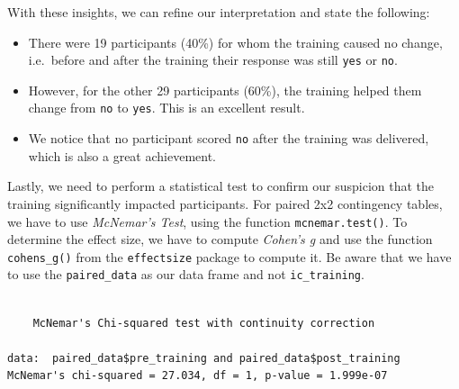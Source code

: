 \documentclass[
  letterpaper,
  DIV=11,
  numbers=noendperiod]{scrreprt}
\newenvironment{Shaded}{\begin{snugshade}}{\end{snugshade}}
\newcommand{\CommentTok}[1]{\textcolor[rgb]{0.37,0.37,0.37}{#1}}
\newcommand{\FunctionTok}[1]{\textcolor[rgb]{0.28,0.35,0.67}{#1}}
\newcommand{\NormalTok}[1]{\textcolor[rgb]{0.00,0.23,0.31}{#1}}
\newcommand{\SpecialCharTok}[1]{\textcolor[rgb]{0.37,0.37,0.37}{#1}}
\begin{document}
With these insights, we can refine our interpretation and state the
following:

\begin{itemize}
\item
  There were 19 participants (40\%) for whom the training caused no
  change, i.e.~before and after the training their response was still
  \texttt{yes} or \texttt{no}.
\item
  However, for the other 29 participants (60\%), the training helped
  them change from \texttt{no} to \texttt{yes}. This is an excellent
  result.
\item
  We notice that no participant scored \texttt{no} after the training
  was delivered, which is also a great achievement.
\end{itemize}

Lastly, we need to perform a statistical test to confirm our suspicion
that the training significantly impacted participants. For paired 2x2
contingency tables, we have to use \emph{McNemar's Test}, using the
function \texttt{mcnemar.test()}. To determine the effect size, we have
to compute \emph{Cohen's g} and use the function \texttt{cohens\_g()}
from the \texttt{effectsize} package to compute it. Be aware that we
have to use the \texttt{paired\_data} as our data frame and not
\texttt{ic\_training}.

\begin{Shaded}
\end{Shaded}

\begin{verbatim}

    McNemar's Chi-squared test with continuity correction

data:  paired_data$pre_training and paired_data$post_training
McNemar's chi-squared = 27.034, df = 1, p-value = 1.999e-07
\end{verbatim}

\begin{Shaded}
\end{Shaded}
\end{document}
